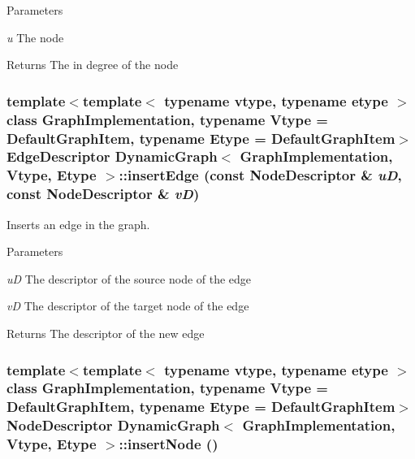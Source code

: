 \begin{DoxyParams}{Parameters}
\item[{\em u}]The node \end{DoxyParams}
\begin{DoxyReturn}{Returns}
The in degree of the node 
\end{DoxyReturn}
\hypertarget{class_dynamic_graph_ab779220d756b42794b03e3176e95bd58}{
\subsubsection[{insertEdge}]{\setlength{\rightskip}{0pt plus 5cm}template$<$template$<$ typename vtype, typename etype $>$ class GraphImplementation, typename Vtype  = DefaultGraphItem, typename Etype  = DefaultGraphItem$>$ EdgeDescriptor {\bf DynamicGraph}$<$ GraphImplementation, Vtype, Etype $>$::insertEdge (const NodeDescriptor \& {\em uD}, \/  const NodeDescriptor \& {\em vD})}}
\label{class_dynamic_graph_ab779220d756b42794b03e3176e95bd58}


Inserts an edge in the graph. 


\begin{DoxyParams}{Parameters}
\item[{\em uD}]The descriptor of the source node of the edge \item[{\em vD}]The descriptor of the target node of the edge\end{DoxyParams}
\begin{DoxyReturn}{Returns}
The descriptor of the new edge 
\end{DoxyReturn}
\hypertarget{class_dynamic_graph_abffc8e608d4e7aaa6f662085adb40dbd}{
\subsubsection[{insertNode}]{\setlength{\rightskip}{0pt plus 5cm}template$<$template$<$ typename vtype, typename etype $>$ class GraphImplementation, typename Vtype  = DefaultGraphItem, typename Etype  = DefaultGraphItem$>$ NodeDescriptor {\bf DynamicGraph}$<$ GraphImplementation, Vtype, Etype $>$::insertNode ()}}
\label{class_dynamic_graph_abffc8e608d4e7aaa6f662085adb40dbd}


